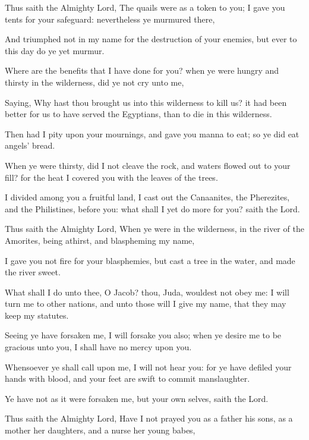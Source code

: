 {\par }{\PP {}Thus saith the Almighty Lord, The quails were as a token to you; I gave you tents for your safeguard: nevertheless ye murmured there,
\par }{\PP {}And triumphed not in my name for the destruction of your enemies, but ever to this day do ye yet murmur.
\par }{\PP {}Where are the benefits that I have done for you? when ye were hungry and thirsty in the wilderness, did ye not cry unto me,
\par }{\PP {}Saying, Why hast thou brought us into this wilderness to kill us? it had been better for us to have served the Egyptians, than to die in this wilderness.
\par }{\PP {}Then had I pity upon your mournings, and gave you manna to eat; so ye did eat angels’ bread.
\par }{\PP {}When ye were thirsty, did I not cleave the rock, and waters flowed out to your fill? for the heat I covered you with the leaves of the trees.
\par }{\PP {}I divided among you a fruitful land, I cast out the Canaanites, the Pherezites, and the Philistines, before you: what shall I yet do more for you? saith the Lord.
\par }{\PP {}Thus saith the Almighty Lord, When ye were in the wilderness, in the river of the Amorites, being athirst, and blaspheming my name,
\par }{\PP {}I gave you not fire for your blasphemies, but cast a tree in the water, and made the river sweet.
\par }{\PP {}What shall I do unto thee, O Jacob? thou, Juda, wouldest not obey me: I will turn me to other nations, and unto those will I give my name, that they may keep my statutes.
\par }{\PP {}Seeing ye have forsaken me, I will forsake you also; when ye desire me to be gracious unto you, I shall have no mercy upon you.
\par }{\PP {}Whensoever ye shall call upon me, I will not hear you: for ye have defiled your hands with blood, and your feet are swift to commit manslaughter.
\par }{\PP {}Ye have not as it were forsaken me, but your own selves, saith the Lord.
\par }{\PP {}Thus saith the Almighty Lord, Have I not prayed you as a father his sons, as a mother her daughters, and a nurse her young babes,
}

